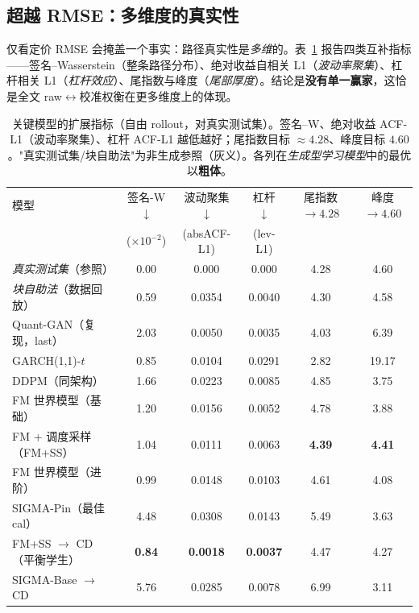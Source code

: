 \documentclass[11pt]{ctexart}
\newcommand{\best}[1]{\textbf{#1}}
\begin{document}
\subsection{超越 RMSE：多维度的真实性}
\label{sec:multimetric}
仅看定价 RMSE 会掩盖一个事实：路径真实性是\emph{多维}的。表~\ref{tab:multi} 报告四类互补指标——签名–Wasserstein（整条路径分布）、绝对收益自相关 L1（\emph{波动率聚集}）、杠杆相关 L1（\emph{杠杆效应}）、尾指数与峰度（\emph{尾部厚度}）。结论是\textbf{没有单一赢家}，这恰是全文 raw$\leftrightarrow$校准权衡在更多维度上的体现。

\begin{table}[t]
\centering
\caption{关键模型的扩展指标（自由 rollout，对真实测试集）。签名–W、绝对收益 ACF-L1（波动率聚集）、杠杆 ACF-L1 越低越好；尾指数目标 $\approx 4.28$、峰度目标 $4.60$。"真实测试集/块自助法"为非生成参照（灰义）。各列在\emph{生成型学习模型}中的最优以\best{粗体}。}
\label{tab:multi}
\small
\begin{tabular}{l c c c c c}
\toprule
模型 & 签名-W $\downarrow$ & 波动聚集 $\downarrow$ & 杠杆 $\downarrow$ & 尾指数 $\to4.28$ & 峰度 $\to4.60$ \\
 & ($\times10^{-2}$) & (absACF-L1) & (lev-L1) & & \\
\midrule
\emph{真实测试集}（参照） & 0.00 & 0.000 & 0.000 & 4.28 & 4.60 \\
\emph{块自助法}（数据回放） & 0.59 & 0.0354 & 0.0040 & 4.30 & 4.58 \\
\midrule
Quant-GAN（复现，last） & 2.03 & 0.0050 & 0.0035 & 4.03 & 6.39 \\
GARCH(1,1)-$t$           & 0.85 & 0.0104 & 0.0291 & 2.82 & 19.17 \\
DDPM（同架构）           & 1.66 & 0.0223 & 0.0085 & 4.85 & 3.75 \\
FM 世界模型（基础）       & 1.20 & 0.0156 & 0.0052 & 4.78 & 3.88 \\
FM + 调度采样（FM+SS）   & 1.04 & 0.0111 & 0.0063 & \best{4.39} & \best{4.41} \\
FM 世界模型（进阶）       & 0.99 & 0.0148 & 0.0103 & 4.61 & 4.08 \\
SIGMA-Pin（最佳 cal）     & 4.48 & 0.0308 & 0.0143 & 5.49 & 3.63 \\
FM+SS $\to$ CD（平衡学生） & \best{0.84} & \best{0.0018} & \best{0.0037} & 4.47 & 4.27 \\
SIGMA-Base $\to$ CD       & 5.76 & 0.0285 & 0.0078 & 6.99 & 3.11 \\
\bottomrule
\end{tabular}
\end{table}
\end{document}
